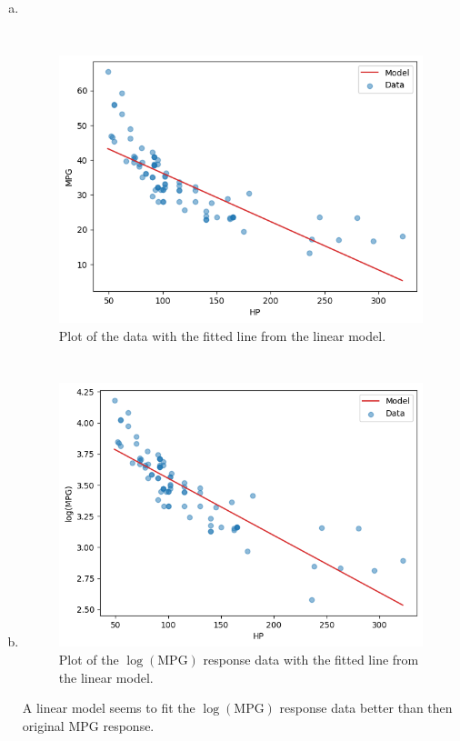 \begin{ex}
  \begin{enumerate}[(a)]
    \item~
          \inputminted{python}{../code/ex13_06a.py}
          \inputminted{text}{../output/ex13_06a.txt}

          \begin{figure}[H]
            \centering
            \includegraphics{../images/13-06a}
            \caption{Plot of the data with the fitted line from the linear model.}
          \end{figure}
    \item
          \inputminted{python}{../code/ex13_06b.py}
          \inputminted{text}{../output/ex13_06b.txt}

          \begin{figure}[H]
            \centering
            \includegraphics{../images/13-06b}
            \caption{Plot of the $\log(\text{MPG})$ response data with the
              fitted line from the linear model.}
          \end{figure}

          A linear model seems to fit the $\log(\text{MPG})$ response data
          better than then original $\text{MPG}$ response.
  \end{enumerate}
\end{ex}


